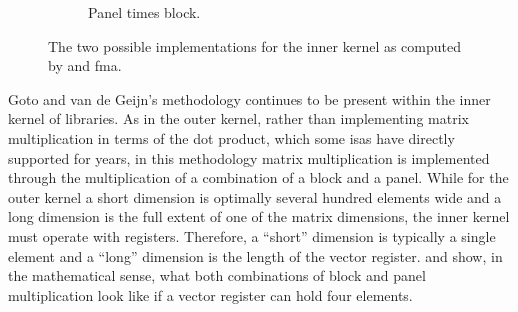 \documentclass[\main/thesis.tex]{subfiles}
\begin{document}
\begin{figure}[t]
\begin{subfigure}{.45\linewidth}
    \caption{Panel times block.}
    \label{fig:gepbSimd}
  \end{subfigure}
  \hfill
  \caption[Inner kernel impelmentations viewed in register]{The two possible implementations for the inner kernel as computed by  and \acrshort{fma}.}
  \label{fig:gepb}
  \vspace{-0.15cm}
\end{figure}


Goto and van de Geijn's methodology continues to be present within the inner kernel of libraries.
As in the outer kernel, rather than implementing matrix multiplication in terms of the dot product, which some \glspl{isa} have directly supported for years\footnotemark, in this methodology matrix multiplication is implemented through the multiplication of a combination of a block and a panel.
While for the outer kernel a short dimension is optimally several hundred elements wide and a long dimension is the full extent of one of the matrix dimensions, the inner kernel must operate with registers.
Therefore, a ``short'' dimension is typically a single element and a ``long'' dimension is the length of the vector register.
 and  show, in the mathematical sense, what both combinations of block and panel multiplication look like if a vector register can hold four elements.
\end{document}
